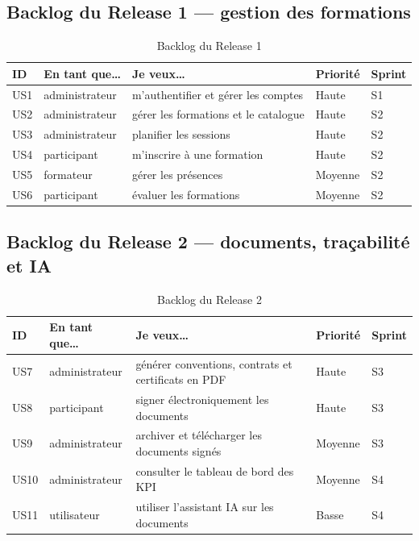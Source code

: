 \documentclass[12pt,a4paper]{report}
\begin{document}
\subsection{Backlog du Release 1 — gestion des formations}
\begin{table}[H]
\small
\begin{tabularx}{\textwidth}{C{1cm} C{2.2cm} X C{1.6cm} C{1.4cm}}
\toprule
\textbf{ID} & \textbf{En tant que\dots} & \textbf{Je veux\dots} & \textbf{Priorité} & \textbf{Sprint} \\
\midrule
US1 & administrateur & m'authentifier et gérer les comptes & Haute & S1 \\
US2 & administrateur & gérer les formations et le catalogue & Haute & S2 \\
US3 & administrateur & planifier les sessions & Haute & S2 \\
US4 & participant & m'inscrire à une formation & Haute & S2 \\
US5 & formateur & gérer les présences & Moyenne & S2 \\
US6 & participant & évaluer les formations & Moyenne & S2 \\
\bottomrule
\end{tabularx}
\caption{Backlog du Release 1}
\end{table}

\subsection{Backlog du Release 2 — documents, traçabilité et IA}
\begin{table}[H]
\small
\begin{tabularx}{\textwidth}{C{1cm} C{2.2cm} X C{1.6cm} C{1.4cm}}
\toprule
\textbf{ID} & \textbf{En tant que\dots} & \textbf{Je veux\dots} & \textbf{Priorité} & \textbf{Sprint} \\
\midrule
US7 & administrateur & générer conventions, contrats et certificats en PDF & Haute & S3 \\
US8 & participant & signer électroniquement les documents & Haute & S3 \\
US9 & administrateur & archiver et télécharger les documents signés & Moyenne & S3 \\
US10 & administrateur & consulter le tableau de bord des KPI & Moyenne & S4 \\
US11 & utilisateur & utiliser l'assistant IA sur les documents & Basse & S4 \\
\bottomrule
\end{tabularx}
\caption{Backlog du Release 2}
\end{table}
\end{document}
